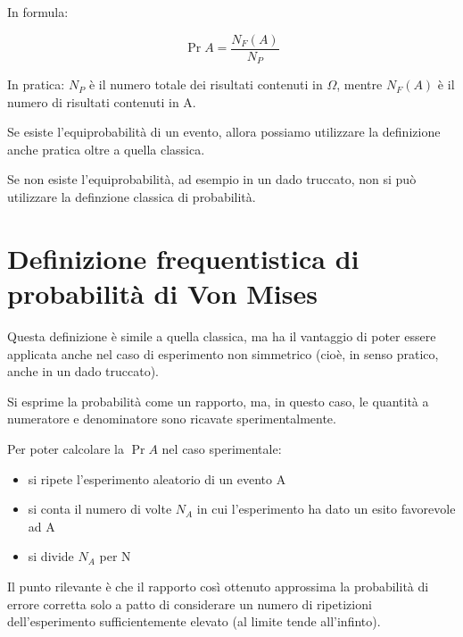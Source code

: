 In formula: 

{
    \Large 
    \begin{equation}
        \Pr{A} = \frac{N_F (A)}{N_P}
    \end{equation}
}

In pratica: $N_P$ è il numero totale dei risultati contenuti in $\Omega$, mentre $N_F (A)$ è il numero di risultati contenuti in A. \newline

Se esiste l'equiprobabilità di un evento, allora possiamo utilizzare la definizione anche pratica oltre a quella classica. \newline 

Se non esiste l'equiprobabilità, ad esempio in un dado truccato, non si può utilizzare la definzione classica di probabilità. \newline 

\newpage 

\section{Definizione frequentistica di probabilità di Von Mises}

Questa definizione è simile a quella classica, ma ha il vantaggio di poter essere applicata anche nel caso di esperimento non simmetrico (cioè, in senso pratico, anche in un dado truccato). \newline 

Si esprime la probabilità come un rapporto, ma, in questo caso, 
le quantità a numeratore e denominatore sono ricavate sperimentalmente. \newline 

Per poter calcolare la $\Pr{A}$ nel caso sperimentale: 

\begin{itemize}
    \item si ripete l'esperimento aleatorio di un evento A 
    \item si conta il numero di volte $N_A$ in cui l'esperimento ha dato un esito favorevole ad A 
    \item si divide $N_A$ per N
\end{itemize}


Il punto rilevante è che il rapporto così ottenuto approssima la probabilità di errore corretta solo a patto di considerare un numero di ripetizioni dell'esperimento sufficientemente elevato 
(al limite tende all'infinto). \newline 

